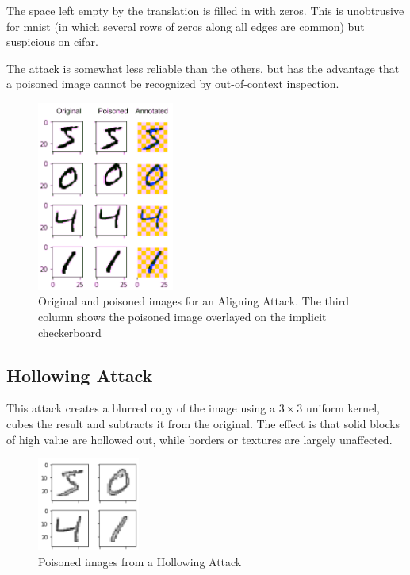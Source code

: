 \documentclass[letterpaper, 10 pt, conference]{ieeeconf}  %
\begin{document}
The space left empty by the translation is filled in with zeros.  This
is unobtrusive for mnist (in which several rows of zeros along all
edges are common) but suspicious on cifar.

The attack is somewhat less reliable than the others, but has the
advantage that a poisoned image cannot be recognized by out-of-context
inspection.

\begin{figure}[h]
\caption{Original and poisoned images for an Aligning Attack.  The third column shows the poisoned image overlayed on the implicit checkerboard}
\centering
\includegraphics[width=0.4\textwidth]{aligner.png}
\end{figure}

\subsection{Hollowing Attack}

This attack creates a blurred copy of the image using a $3\times 3$
uniform kernel, cubes the result and subtracts it from the original.
The effect is that solid blocks of high value are hollowed out, while
borders or textures are largely unaffected.

\begin{figure}[h]
\caption{Poisoned images from a Hollowing Attack}
\centering
\includegraphics[width=0.3\textwidth]{hollow.png}
\end{figure}
\end{document}
